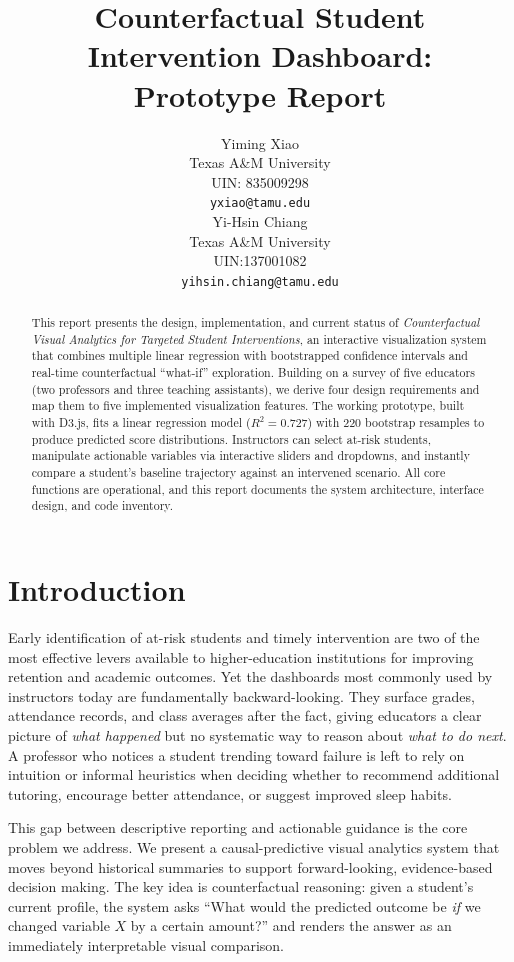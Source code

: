 \documentclass[11pt]{article}
\title{Counterfactual Student Intervention Dashboard:\\Prototype Report}
\author{Yiming Xiao \\
  Texas A\&M University \\
  UIN: 835009298\\
  \texttt{yxiao@tamu.edu} \\\And
  Yi-Hsin Chiang \\
  Texas A\&M University \\
  UIN:137001082 \\
  \texttt{yihsin.chiang@tamu.edu} \\}
\begin{document}
{\makeatletter\acl@finalcopytrue
  \maketitle
}

\begin{abstract}
This report presents the design, implementation, and current status of \textit{Counterfactual Visual Analytics for Targeted Student Interventions}, an interactive visualization system that combines multiple linear regression with bootstrapped confidence intervals and real-time counterfactual ``what-if'' exploration. Building on a survey of five educators (two professors and three teaching assistants), we derive four design requirements and map them to five implemented visualization features. The working prototype, built with D3.js, fits a linear regression model ($R^2 = 0.727$) with 220 bootstrap resamples to produce predicted score distributions. Instructors can select at-risk students, manipulate actionable variables via interactive sliders and dropdowns, and instantly compare a student's baseline trajectory against an intervened scenario. All core functions are operational, and this report documents the system architecture, interface design, and code inventory.
\end{abstract}

\section{Introduction}

Early identification of at-risk students and timely intervention are two of the most effective levers available to higher-education institutions for improving retention and academic outcomes. Yet the dashboards most commonly used by instructors today are fundamentally backward-looking. They surface grades, attendance records, and class averages after the fact, giving educators a clear picture of \textit{what happened} but no systematic way to reason about \textit{what to do next}. A professor who notices a student trending toward failure is left to rely on intuition or informal heuristics when deciding whether to recommend additional tutoring, encourage better attendance, or suggest improved sleep habits.

This gap between descriptive reporting and actionable guidance is the core problem we address. We present a causal-predictive visual analytics system that moves beyond historical summaries to support forward-looking, evidence-based decision making. The key idea is counterfactual reasoning: given a student's current profile, the system asks ``What would the predicted outcome be \textit{if} we changed variable $X$ by a certain amount?'' and renders the answer as an immediately interpretable visual comparison.
\end{document}
